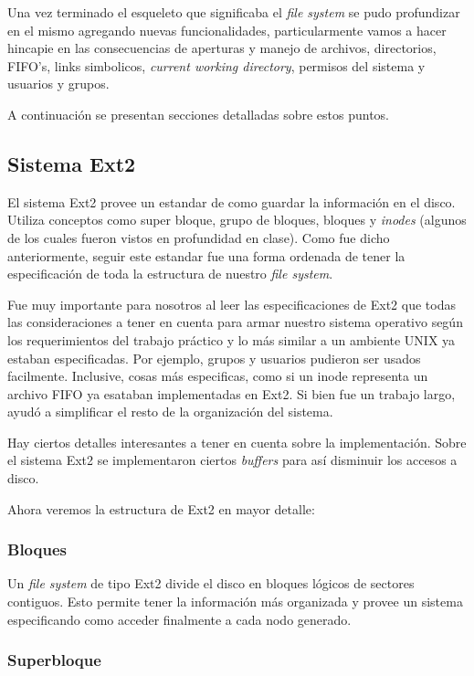\documentclass[a4paper,10pt]{article}
\begin{document}
    Una vez terminado el esqueleto que significaba el \textit{file system} se pudo profundizar en el mismo agregando
    nuevas funcionalidades, particularmente vamos a hacer hincapie en las consecuencias de aperturas y manejo de
    archivos, directorios, FIFO's, links simbolicos, \textit{current working
    directory}, permisos del sistema y usuarios y grupos.

    A continuación se presentan secciones detalladas sobre estos puntos.

    \subsection{Sistema Ext2}
    El sistema Ext2 provee un estandar de como guardar la información en el disco. Utiliza conceptos como super bloque, 
    grupo de bloques, bloques y \textit{inodes} (algunos de los cuales fueron vistos en profundidad en clase). Como fue
    dicho anteriormente, seguir este estandar fue una forma ordenada de tener la especificación de toda la estructura
    de nuestro \textit{file system}.

    Fue muy importante para nosotros al leer las especificaciones de Ext2 que todas las consideraciones a tener en cuenta
    para armar nuestro sistema operativo según los requerimientos del trabajo práctico y lo más similar a un ambiente
    UNIX ya estaban especificadas. Por ejemplo, grupos y usuarios pudieron ser usados facilmente. Inclusive, cosas más
    especificas, como si un inode representa un archivo FIFO ya esataban implementadas en Ext2. Si bien fue un trabajo
    largo, ayudó a simplificar el resto de la organización del sistema.

    Hay ciertos detalles interesantes a tener en cuenta sobre la implementación. Sobre el sistema Ext2 se implementaron
    ciertos \textit{buffers} para así disminuir los accesos a disco.

    Ahora veremos la estructura de Ext2 en mayor detalle:

        \subsubsection{Bloques}

        Un \textit{file system} de tipo Ext2 divide el disco en bloques lógicos de sectores contiguos. Esto permite
        tener la información más organizada y provee un sistema especificando como acceder finalmente a cada nodo
        generado.

        \subsubsection{Superbloque}
\end{document}

